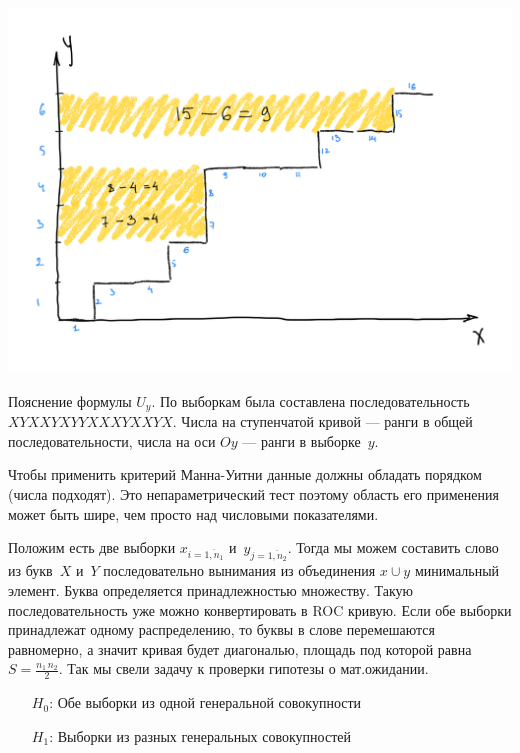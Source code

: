 \documentclass[a4paper, oneside]{book}
\begin{document}
\begin{marginfigure}
    \includegraphics[width=1.1\columnwidth]{pics/Uy_square.pdf}
    \label{fig:mann-whitney_roc}
    \caption{
        Пояснение формулы $U_y$. По выборкам была составлена последовательность
        $XYXXYXYYXXXYXXYX$. Числа на ступенчатой кривой --- ранги в общей
        последовательности, числа на оси $Oy$ --- ранги в выборке~$y$.
    }
\end{marginfigure}
Чтобы применить критерий Манна-Уитни данные должны обладать порядком (числа
подходят). Это непараметрический тест поэтому область его применения может быть
шире, чем просто над числовыми показателями.

Положим есть две выборки $x_{i=\overline{1, n_1}}$ и~$y_{j=\overline{1, n_2}}$.
Тогда мы можем составить слово из букв~$X$ и~$Y$ последовательно вынимания из
объединения $x \cup y$ минимальный элемент. Буква определяется принадлежностью
множеству. Такую последовательность уже можно конвертировать в ROC кривую. Если
обе выборки принадлежат одному распределению, то буквы в слове перемешаются
равномерно, а значит кривая будет диагональю, площадь под которой равна
$S=\frac{n_1\,n_2}{2}$. Так мы свели задачу к проверки гипотезы о мат.ожидании.

\begin{itemize}
    \item[$H_0$:] Обе выборки из одной генеральной совокупности
    \item[$H_1$:] Выборки из разных генеральных совокупностей
\end{itemize}
\end{document}
